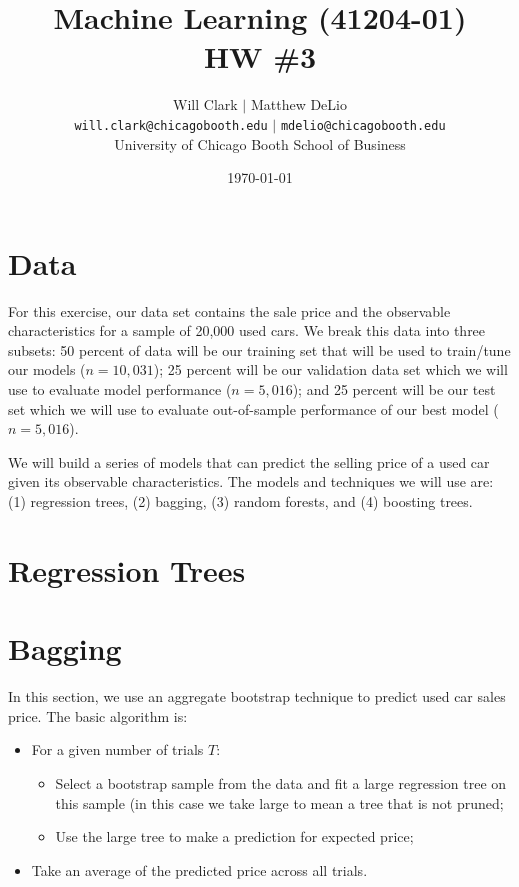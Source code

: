 \documentclass[11pt, fleqn]{article}
\begin{document}
\title{Machine Learning (41204-01)\\HW \#3}
\author{Will Clark $\vert$ Matthew DeLio \\
\texttt{will.clark@chicagobooth.edu} $\vert$ \texttt{mdelio@chicagobooth.edu} \\
University of Chicago Booth School of Business}
\date{\today}
\maketitle

\section{Data}

For this exercise, our data set contains the sale price and the observable characteristics for a sample of 20,000 used cars. We break this data into three subsets: 50 percent of data will be our training set that will be used to train/tune our models ($n=10,031$); 25 percent will be our validation data set which we will use to evaluate model performance ($n=5,016$); and 25 percent will be our test set which we will use to evaluate out-of-sample performance of our best model ($n=5,016$).

We will build a series of models that can predict the selling price of a used car given its observable characteristics. The models and techniques we will use are: (1) regression trees, (2) bagging, (3) random forests, and (4) boosting trees.

\section{Regression Trees}



\section{Bagging}

In this section, we use an aggregate bootstrap technique to predict used car sales price. The basic algorithm is:
\begin{itemize}
\item For a given number of trials $T$:
\begin{itemize}
\item Select a bootstrap sample from the data and fit a large regression tree on this sample (in this case we take large to mean a tree that is not pruned;
\item Use the large tree to make a prediction for expected price;
\end{itemize}
\item Take an average of the predicted price across all trials.
\end{itemize}
\end{document}
